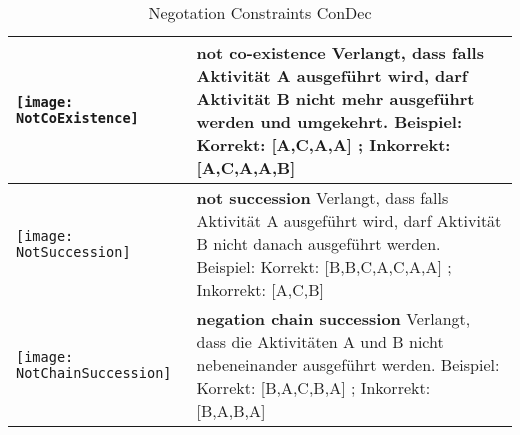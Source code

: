  
 \begin {table}[H]

\begin{tabular}{|p{}|p{}|}
\hline
\begin{center}

  \texttt{[image: NotCoExistence]} %
    \end{center} &
\textbf{not co-existence}\newline
  Verlangt, dass falls Aktivität A ausgeführt wird, darf Aktivität B nicht mehr ausgeführt werden und umgekehrt.
  \newline
  Beispiel: Korrekt: [A,C,A,A] ; Inkorrekt: [A,C,A,A,B] \\
\hline

\hline
\begin{center}

  \texttt{[image: NotSuccession]} %
    \end{center} &
\textbf{not succession}\newline
  Verlangt, dass falls Aktivität A ausgeführt wird, darf Aktivität B nicht danach ausgeführt werden.
  \newline
  Beispiel: Korrekt: [B,B,C,A,C,A,A] ; Inkorrekt: [A,C,B]\\
\hline

\hline
\begin{center}

  \texttt{[image: NotChainSuccession]} %
    \end{center} &
\textbf{negation chain succession}\newline
  Verlangt, dass die Aktivitäten A und B nicht nebeneinander ausgeführt werden.
  \newline
  Beispiel: Korrekt: [B,A,C,B,A] ; Inkorrekt: [B,A,B,A] \\
\hline

 \end{tabular}
 \caption{Negotation Constraints ConDec}
\label{tab:relation}
 \end{table}

\cite{Montali2010, Pesic200}
